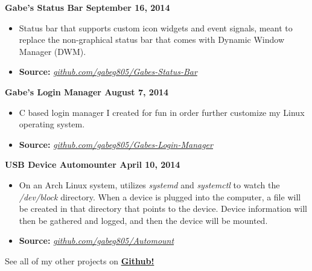 \documentclass[margin,line,a4paper]{resume}
\begin{document}
\begin{resume}
    \textbf{Gabe's Status Bar \hfill September 16, 2014}
    \vspace{1mm}
    \begin{itemize}
        \item Status bar that supports custom icon widgets and event signals, meant
        to replace the non-graphical status bar that comes with Dynamic Window
        Manager (DWM).
        \item \textbf{Source: } \textsl{\href{http://github.com/gabeg805/Gabes-Status-Bar}{github.com/gabeg805/Gabes-Status-Bar}}
    \end{itemize}
    \vspace{-1mm}
    
    \textbf{Gabe's Login Manager \hfill August 7, 2014}
    \vspace{1mm}
    \begin{itemize}
        \item C based login manager I created for fun in order further customize my Linux operating
          system.
        \item \textbf{Source: } \textsl{\href{http://github.com/gabeg805/Gabes-Login-Manager}{github.com/gabeg805/Gabes-Login-Manager}}
    \end{itemize}
    \vspace{-1mm} 
    
    \textbf{USB Device Automounter \hfill April 10, 2014}
    \vspace{1mm}
    \begin{itemize}
        \item On an Arch Linux system, utilizes \textsl{systemd} and
          \textsl{systemctl} to watch the \textsl{/dev/block} directory. When a
          device is plugged into the computer, a file will be created in that
          directory that points to the device. Device information will then be
          gathered and logged, and then the device will be mounted.
        \item \textbf{Source: } \textsl{\href{http://github.com/gabeg805/Automount}{github.com/gabeg805/Automount}}
    \end{itemize}
    \vspace{-1mm}
    
    See all of my other projects on \textbf{{\href{http://github.com/gabeg805}{Github!}}}
    
    
    
    
    
    
    

\end{resume}
\end{document}
